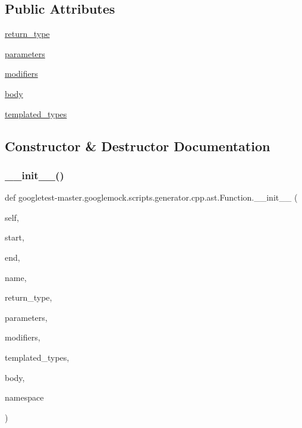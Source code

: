 \subsection*{Public Attributes}
\begin{DoxyCompactItemize}
\item 
\mbox{\hyperlink{classgoogletest-master_1_1googlemock_1_1scripts_1_1generator_1_1cpp_1_1ast_1_1_function_acb4b1157aed43d51b432c427bd88baa4}{return\+\_\+type}}
\item 
\mbox{\hyperlink{classgoogletest-master_1_1googlemock_1_1scripts_1_1generator_1_1cpp_1_1ast_1_1_function_af76a83e6dd2481ee5d9054554d815e38}{parameters}}
\item 
\mbox{\hyperlink{classgoogletest-master_1_1googlemock_1_1scripts_1_1generator_1_1cpp_1_1ast_1_1_function_a7ffef761b1a623bd591d24cbd1390342}{modifiers}}
\item 
\mbox{\hyperlink{classgoogletest-master_1_1googlemock_1_1scripts_1_1generator_1_1cpp_1_1ast_1_1_function_a21777a3e5688e715c06b7cf4e9cf19b9}{body}}
\item 
\mbox{\hyperlink{classgoogletest-master_1_1googlemock_1_1scripts_1_1generator_1_1cpp_1_1ast_1_1_function_affaa64164d51cbedc6750e856375963a}{templated\+\_\+types}}
\end{DoxyCompactItemize}


\subsection{Constructor \& Destructor Documentation}
\mbox{\label{classgoogletest-master_1_1googlemock_1_1scripts_1_1generator_1_1cpp_1_1ast_1_1_function_a543b5965c2954b3c9899cedb95094838}} 
\subsubsection{\texorpdfstring{\_\_init\_\_()}{\_\_init\_\_()}}
{\footnotesize\ttfamily def googletest-\/master.\+googlemock.\+scripts.\+generator.\+cpp.\+ast.\+Function.\+\_\+\+\_\+init\+\_\+\+\_\+ (\begin{DoxyParamCaption}\item[{}]{self,  }\item[{}]{start,  }\item[{}]{end,  }\item[{}]{name,  }\item[{}]{return\+\_\+type,  }\item[{}]{parameters,  }\item[{}]{modifiers,  }\item[{}]{templated\+\_\+types,  }\item[{}]{body,  }\item[{}]{namespace }\end{DoxyParamCaption})}



